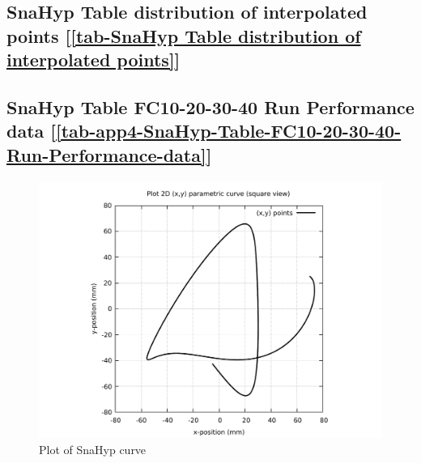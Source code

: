 \subsection    {SnaHyp Table distribution of interpolated points
	[\ref      {tab-SnaHyp Table distribution of interpolated points}] }
\label{ssec-tab-SnaHyp Table distribution of interpolated points}

\subsection         {SnaHyp Table FC10-20-30-40 Run Performance data
	[\ref      {tab-app4-SnaHyp-Table-FC10-20-30-40-Run-Performance-data}] }
\label{ssec-tab-app4-SnaHyp-Table-FC10-20-30-40-Run-Performance-data}


\clearpage
\pagebreak

\begin{figure}
	\caption     {Plot of SnaHyp curve}
	\label{01-img-Plot of SnaHyp curve.pdf}
\includegraphics[width=1.00\textwidth]{Chap4/appendix/app-SnaHyp/plots/01-img-Plot of SnaHyp curve.pdf}
\end{figure}	


